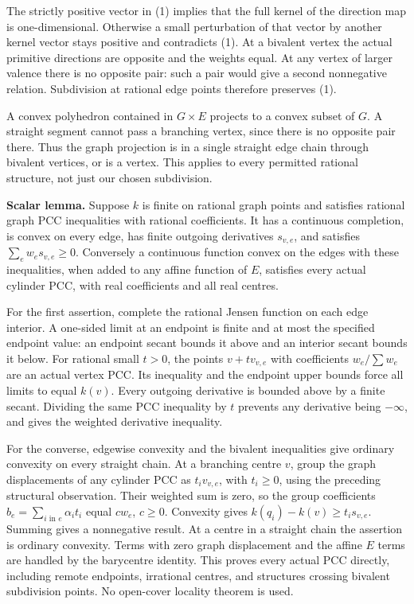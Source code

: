 \documentclass[
  11pt,
]{article}
\begin{document}
The strictly positive vector in (1) implies that the full kernel of the
direction map is one-dimensional. Otherwise a small perturbation of that
vector by another kernel vector stays positive and contradicts (1). At a
bivalent vertex the actual primitive directions are opposite and the
weights equal. At any vertex of larger valence there is no opposite
pair: such a pair would give a second nonnegative relation. Subdivision
at rational edge points therefore preserves (1).

A convex polyhedron contained in \(G\times E\) projects to a convex
subset of \(G\). A straight segment cannot pass a branching vertex,
since there is no opposite pair there. Thus the graph projection is in a
single straight edge chain through bivalent vertices, or is a vertex.
This applies to every permitted rational structure, not just our chosen
subdivision.

\textbf{Scalar lemma.} Suppose \(k\) is finite on rational graph points
and satisfies rational graph PCC inequalities with rational
coefficients. It has a continuous completion, is convex on every edge,
has finite outgoing derivatives \(s_{v,e}\), and satisfies
\(\sum_e w_es_{v,e}\geq0\). Conversely a continuous function convex on
the edges with these inequalities, when added to any affine function of
\(E\), satisfies every actual cylinder PCC, with real coefficients and
all real centres.

For the first assertion, complete the rational Jensen function on each
edge interior. A one-sided limit at an endpoint is finite and at most
the specified endpoint value: an endpoint secant bounds it above and an
interior secant bounds it below. For rational small \(t>0\), the points
\(v+t v_{v,e}\) with coefficients \(w_e/\sum w_e\) are an actual vertex
PCC. Its inequality and the endpoint upper bounds force all limits to
equal \(k(v)\). Every outgoing derivative is bounded above by a finite
secant. Dividing the same PCC inequality by \(t\) prevents any
derivative being \(-\infty\), and gives the weighted derivative
inequality.

For the converse, edgewise convexity and the bivalent inequalities give
ordinary convexity on every straight chain. At a branching centre \(v\),
group the graph displacements of any cylinder PCC as \(t_i v_{v,e}\),
with \(t_i\geq0\), using the preceding structural observation. Their
weighted sum is zero, so the group coefficients
\(b_e=\sum_{i\text{ in }e}\alpha_it_i\) equal \(cw_e\), \(c\geq0\).
Convexity gives \(k(q_i)-k(v)\geq t_i s_{v,e}\). Summing gives a
nonnegative result. At a centre in a straight chain the assertion is
ordinary convexity. Terms with zero graph displacement and the affine
\(E\) terms are handled by the barycentre identity. This proves every
actual PCC directly, including remote endpoints, irrational centres, and
structures crossing bivalent subdivision points. No open-cover locality
theorem is used.
\end{document}
